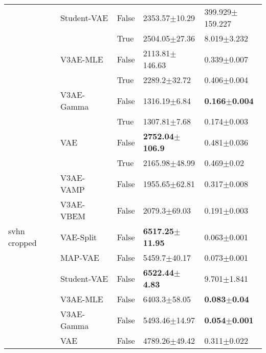 \begin{tabular}{lllll}
             & Student-VAE & False &           2353.57$\pm$10.29 &       399.929$\pm$159.227 \\
             &     & True  &           2504.05$\pm$27.36 &           8.019$\pm$3.232 \\
             & V3AE-MLE & False &          2113.81$\pm$146.63 &           0.339$\pm$0.007 \\
             &     & True  &            2289.2$\pm$32.72 &           0.406$\pm$0.004 \\
             & V3AE-Gamma & False &            1316.19$\pm$6.84 &  \textbf{0.166$\pm$0.004} \\
             &     & True  &            1307.81$\pm$7.68 &           0.174$\pm$0.003 \\
             & VAE & False &  \textbf{2752.04$\pm$106.9} &           0.481$\pm$0.036 \\
             &     & True  &           2165.98$\pm$48.99 &            0.469$\pm$0.02 \\
             & V3AE-VAMP & False &           1955.65$\pm$62.81 &           0.317$\pm$0.008 \\
             & V3AE-VBEM & False &            2079.3$\pm$69.03 &           0.191$\pm$0.003 \\
svhn cropped & VAE-Split & False &  \textbf{6517.25$\pm$11.95} &           0.063$\pm$0.001 \\
             & MAP-VAE & False &            5459.7$\pm$40.17 &           0.073$\pm$0.001 \\
             & Student-VAE & False &   \textbf{6522.44$\pm$4.83} &           9.701$\pm$1.841 \\
             & V3AE-MLE & False &            6403.3$\pm$58.05 &   \textbf{0.083$\pm$0.04} \\
             & V3AE-Gamma & False &           5493.46$\pm$14.97 &  \textbf{0.054$\pm$0.001} \\
             & VAE & False &           4789.26$\pm$49.42 &           0.311$\pm$0.022 \\
\bottomrule
\end{tabular}

